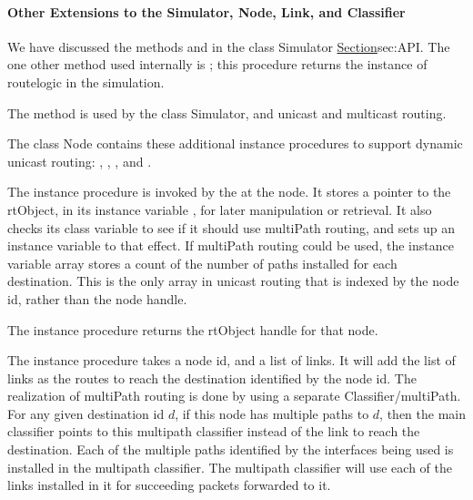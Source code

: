 \paragraph{Other Extensions to the Simulator, Node, Link, and Classifier}
\begin{list}{---}{}
\item   %
  We have discussed the methods  and 
  in the class Simulator \href{earlier}{Section}{sec:API}.
  The one other method used internally is
  ;
  this procedure returns the instance of routelogic in the simulation.

  The method is used by the class Simulator, and unicast and multicast routing.

\item   %
   The class Node contains these additional instance procedures
   to support dynamic unicast routing:
,
,
,
and
.

The instance procedure 
is invoked by the  at the node.
It stores a pointer to the rtObject, in its instance variable
, for later manipulation or retrieval.
It also checks its class variable to see if it should use multiPath routing,
and sets up an instance variable to that effect.
If multiPath routing could be used,
the instance variable array  stores a count of the number of
paths installed for each destination.
This is the only array in unicast routing that is indexed by the node id,
rather than the node handle.

The instance procedure 
returns the rtObject handle for that node.

The instance procedure 
takes a node id, and a list of links.
It will add the list of links as the routes to reach the destination
identified by the node id.
The realization of multiPath routing is done by using a separate
Classifier/multiPath.
For any given destination id $d$, if this node has multiple paths to $d$,
then the main classifier points to this multipath classifier instead of 
the link to reach the destination.
Each of the multiple paths identified by the interfaces being used is
installed in the multipath classifier.
The multipath classifier will use each of the links installed in it for
succeeding packets forwarded to it.


\end{list}
